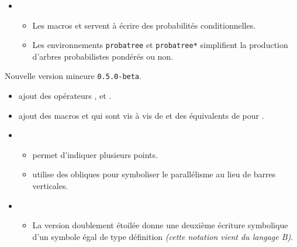 \documentclass[12pt,a4paper]{book}
\begin{document}
\begin{description}
\begin{itemize}[itemsep=.5em]


    \item {}
    \begin{itemize}[itemsep=.5em]
        \item Les macros  et  servent à écrire des probabilités conditionnelles.

        \item Les environnements \verb+probatree+ et \verb+probatree*+ simplifient la production d'arbres probabilistes pondérés ou non.
    \end{itemize}
\end{itemize}

\end{description}\begin{description}
\medskip
\item[2019-09-27] Nouvelle version mineure \verb+0.5.0-beta+.

\begin{itemize}[itemsep=.5em]
    \item {}
          ajout des opérateurs ,  et .




    \item {}
           ajout des macros  et  qui sont vis à vis de  et  des équivalents de  pour .




    \item {}
    \begin{itemize}[itemsep=.5em]
        \item {} permet d'indiquer plusieurs points.

        \item {} utilise des obliques pour symboliser le parallélisme au lieu de barres verticales.
    \end{itemize}




    \item {}
    \begin{itemize}[itemsep=.5em]
        \item La version doublement étoilée  donne une deuxième écriture symbolique d'un symbole égal de type définition \emph{(cette notation vient du langage B)}.


\end{itemize}
\end{itemize}
\end{description}
\end{document}
